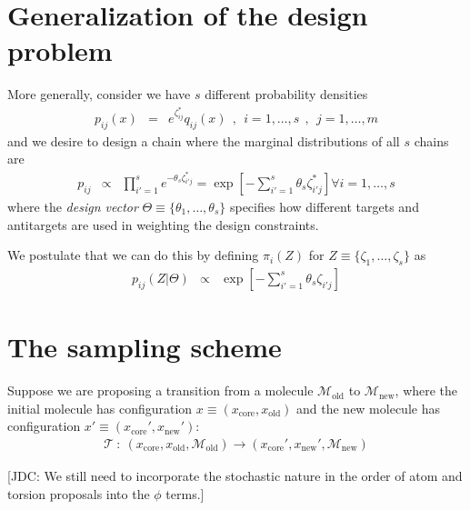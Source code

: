 \documentclass[aps,pre,twocolumn,nofootinbib,superscriptaddress,linenumbers,11point]{revtex4-1}
\begin{document}
\section*{Generalization of the design problem}
\label{section:generalization}

More generally, consider we have $s$ different probability densities
\begin{eqnarray}
p_{ij}(x) &=& e^{\zeta_{ij}^*} q_{ij}(x) \:\:,\:\: i = 1,\ldots, s\:\:, \:\: j = 1,\ldots, m
\end{eqnarray}
and we desire to design a chain where the marginal distributions of all $s$ chains are
\begin{eqnarray}
p_{ij} &\propto& \prod_{i'=1}^s e^{-\theta_s \zeta_{i'j}^*} = \exp\left[ - \sum_{i'=1}^s \theta_s \zeta_{i'j}^* \right] \forall i = 1,\ldots, s
\end{eqnarray}
where the \emph{design vector} $\Theta \equiv \{ \theta_1, \ldots, \theta_s \}$ specifies how different targets and antitargets are used in weighting the design constraints.

We postulate that we can do this by defining $\pi_i(Z)$ for $Z \equiv \{\zeta_1, \ldots, \zeta_s\}$ as
\begin{eqnarray}
p_{ij}(Z | \Theta) &\propto& \exp\left[ - \sum_{i'=1}^s \theta_s \zeta_{i'j} \right]
\end{eqnarray}


\section*{The sampling scheme}
\label{section:sampling scheme}

Suppose we are proposing a transition from a molecule $\mathcal{M}_\mathrm{old}$ to $\mathcal{M}_\mathrm{new}$, where the initial molecule has configuration $x \equiv (x_\mathrm{core}, x_\mathrm{old})$ and the new molecule has configuration $x' \equiv (x_\mathrm{core}', x_\mathrm{new}')$:
\begin{eqnarray}
\mathcal{T} \: : \: (x_\mathrm{core}, x_\mathrm{old}, \mathcal{M}_\mathrm{old}) \rightarrow (x_\mathrm{core}', x_\mathrm{new}', \mathcal{M}_\mathrm{new})
\end{eqnarray}

{\color{red}[JDC: We still need to incorporate the stochastic nature in the order of atom and torsion proposals into the $\phi$ terms.]}
\end{document}
